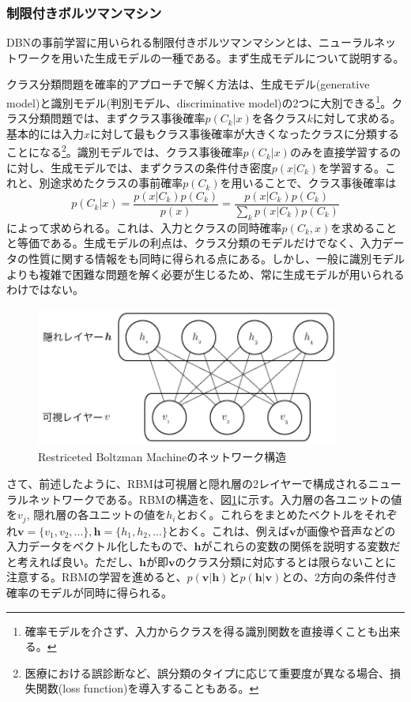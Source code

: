 \subsubsection{制限付きボルツマンマシン}
DBNの事前学習に用いられる制限付きボルツマンマシン\cite{rumelhart1986parallel}とは、ニューラルネットワークを用いた生成モデルの一種である。まず生成モデルについて説明する。\par
クラス分類問題を確率的アプローチで解く方法は、生成モデル(generative model)と識別モデル(判別モデル、discriminative model)の2つに大別できる\cite{bishop2006pattern}\footnote{確率モデルを介さず、入力からクラスを得る識別関数を直接導くことも出来る。}。クラス分類問題では、まずクラス事後確率$p(C_k|x)$を各クラス$k$に対して求める。基本的には入力$x$に対して最もクラス事後確率が大きくなったクラスに分類することになる\footnote{医療における誤診断など、誤分類のタイプに応じて重要度が異なる場合、損失関数(loss function)を導入することもある。}。識別モデルでは、クラス事後確率$p(C_k|x)$のみを直接学習するのに対し、生成モデルでは、まずクラスの条件付き密度$p(x|C_k)$を学習する。これと、別途求めたクラスの事前確率$p(C_k)$を用いることで、クラス事後確率は
\begin{equation}
p(C_k|x) = \frac{p(x | C_k)p(C_k)}{p(x)} = \frac{p(x | C_k)p(C_k)}{\sum_{k}p(x | C_k)p(C_k)}
\end{equation}
によって求められる。これは、入力とクラスの同時確率$p(C_k, x)$を求めることと等価である。生成モデルの利点は、クラス分類のモデルだけでなく、入力データの性質に関する情報をも同時に得られる点にある。しかし、一般に識別モデルよりも複雑で困難な問題を解く必要が生じるため、常に生成モデルが用いられるわけではない。\par
\begin{figure}[tbp]
 \centering
  \includegraphics[width=100mm]{img/c3/rbm}
 \caption{Restriceted Boltzman Machineのネットワーク構造}
 \label{c3_rbm}
\end{figure}
さて、前述したように、RBMは可視層と隠れ層の2レイヤーで構成されるニューラルネットワークである。RBMの構造を、図\ref{c3_rbm}に示す。入力層の各ユニットの値を$v_j$, 隠れ層の各ユニットの値を$h_i$とおく。これらをまとめたベクトルをそれぞれ$\bm{v}=\{v_1, v_2, ...\}, \bm{h}=\{h_1, h_2, ...\}$とおく。これは、例えば$\bm{v}$が画像や音声などの入力データをベクトル化したもので、$\bm{h}$がこれらの変数の関係を説明する変数だと考えれば良い。ただし、$\bm{h}$が即$\bm{v}$のクラス分類に対応するとは限らないことに注意する。RBMの学習を進めると、$p(\bm{v}|\bm{h})$と$p(\bm{h}|\bm{v})$との、2方向の条件付き確率のモデルが同時に得られる。\par
